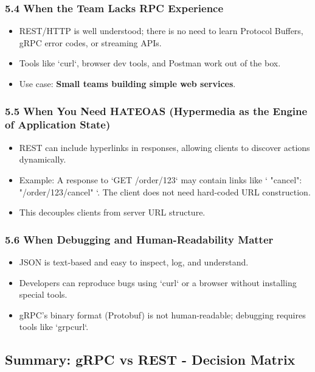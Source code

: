 \documentclass[10pt,a4paper]{article}
\begin{document}
\subsubsection{5.4 When the Team Lacks RPC Experience}
\begin{itemize}
    \item REST/HTTP is well understood; there is no need to learn Protocol Buffers, gRPC error codes, or streaming APIs.
    \item Tools like `curl`, browser dev tools, and Postman work out of the box.
    \item Use case: \textbf{Small teams building simple web services}.
\end{itemize}

\subsubsection{5.5 When You Need HATEOAS (Hypermedia as the Engine of Application State)}
\begin{itemize}
    \item REST can include hyperlinks in responses, allowing clients to discover actions dynamically.
    \item Example: A response to `GET /order/123` may contain links like `{ "cancel": "/order/123/cancel" }`. The client does not need hard-coded URL construction.
    \item This decouples clients from server URL structure.
\end{itemize}

\subsubsection{5.6 When Debugging and Human-Readability Matter}
\begin{itemize}
    \item JSON is text-based and easy to inspect, log, and understand.
    \item Developers can reproduce bugs using `curl` or a browser without installing special tools.
    \item gRPC’s binary format (Protobuf) is not human-readable; debugging requires tools like `grpcurl`.
\end{itemize}

\subsection{Summary: gRPC vs REST - Decision Matrix}
\end{document}
